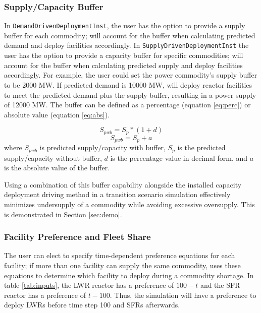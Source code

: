     \subsubsection{\textbf{Supply/Capacity Buffer}}
    In \texttt{DemandDrivenDeploymentInst}, the user has the option 
    to provide a supply buffer for each commodity; \deploy will account 
    for the buffer when calculating predicted demand and 
    deploy facilities accordingly.
    In \texttt{SupplyDrivenDeploymentInst} the user has the option 
    to provide a capacity buffer for specific commodities; 
    \deploy will account 
    for the buffer when calculating predicted supply and 
    deploy facilities accordingly.
    For example, the user could set the power commodity's supply buffer 
    to be 2000 MW. 
    If predicted demand is 10000 MW, \deploy will deploy reactor 
    facilities to meet the predicted demand plus the supply buffer, resulting 
    in a power supply of 12000 MW.  
    The buffer can be defined as a percentage (equation \ref{eq:perc}) 
    or absolute value (equation \ref{eq:abs}). 
    
    \begin{equation}
        \label{eq:perc}
        S_{pwb} = S_{p}*(1+d)
    \end{equation}
    \begin{equation}
        \label{eq:abs}
        S_{pwb} = S_{p}+a
    \end{equation}
    where $S_{pwb}$ is predicted supply/capacity with buffer, 
    $S_p$ is the predicted supply/capacity without buffer, 
    $d$ is the percentage value in decimal form, 
    and $a$ is the absolute value of the buffer. 
    
    Using a combination of this buffer capability alongside the 
    installed capacity deployment driving method in a transition 
    scenario simulation effectively minimizes undersupply of a 
    commodity while avoiding excessive oversupply. 
    This is demonstrated in Section \ref{sec:demo}. 
    
    \subsubsection{\textbf{Facility Preference and Fleet Share}}
    The user can elect to specify time-dependent preference equations 
    for each facility; if more than one facility can supply the same 
    commodity, \deploy uses these equations to determine which facility 
    to deploy during a commodity shortage. 
    In table \ref{tab:inputs}, 
    the \gls{LWR} reactor has a preference of $100-t$ and the 
    \gls{SFR} reactor has a preference of $t-100$. 
    Thus, the simulation will have a preference to deploy 
    \glspl{LWR} before time step 100 and \glspl{SFR} afterwards. 
    
